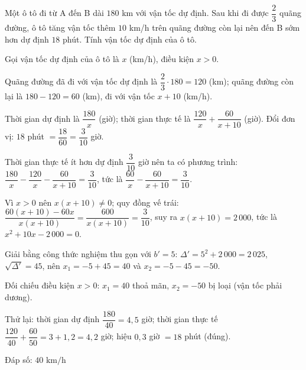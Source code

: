 \begin{problem}[9DS-PT2-049]
Một ô tô đi từ A đến B dài $180$ km với vận tốc dự định. Sau khi đi được $\dfrac{2}{3}$ quãng đường, ô tô tăng vận tốc thêm $10$ km/h trên quãng đường còn lại nên đến B sớm hơn dự định $18$ phút. Tính vận tốc dự định của ô tô.

\begin{solution}
Gọi vận tốc dự định của ô tô là $x$ (km/h), điều kiện $x > 0$.

Quãng đường đã đi với vận tốc dự định là $\dfrac{2}{3} \cdot 180 = 120$ (km); quãng đường còn lại là $180 - 120 = 60$ (km), đi với vận tốc $x + 10$ (km/h).

Thời gian dự định là $\dfrac{180}{x}$ (giờ); thời gian thực tế là $\dfrac{120}{x} + \dfrac{60}{x + 10}$ (giờ). Đổi đơn vị: $18$ phút $= \dfrac{18}{60} = \dfrac{3}{10}$ giờ.

Thời gian thực tế ít hơn dự định $\dfrac{3}{10}$ giờ nên ta có phương trình: $\dfrac{180}{x} - \dfrac{120}{x} - \dfrac{60}{x + 10} = \dfrac{3}{10}$, tức là $\dfrac{60}{x} - \dfrac{60}{x + 10} = \dfrac{3}{10}$.

Vì $x > 0$ nên $x(x + 10) \neq 0$; quy đồng vế trái: $\dfrac{60(x + 10) - 60x}{x(x + 10)} = \dfrac{600}{x(x + 10)} = \dfrac{3}{10}$, suy ra $x(x + 10) = 2\,000$, tức là $x^2 + 10x - 2\,000 = 0$.

Giải bằng công thức nghiệm thu gọn với $b' = 5$: $\Delta' = 5^2 + 2\,000 = 2\,025$, $\sqrt{\Delta'} = 45$, nên $x_1 = -5 + 45 = 40$ và $x_2 = -5 - 45 = -50$.

Đối chiếu điều kiện $x > 0$: $x_1 = 40$ thoả mãn, $x_2 = -50$ bị loại (vận tốc phải dương).

Thử lại: thời gian dự định $\dfrac{180}{40} = 4{,}5$ giờ; thời gian thực tế $\dfrac{120}{40} + \dfrac{60}{50} = 3 + 1{,}2 = 4{,}2$ giờ; hiệu $0{,}3$ giờ $= 18$ phút (đúng).

Đáp số: $\boxed{40 \text{ km/h}}$
\end{solution}
\end{problem}

